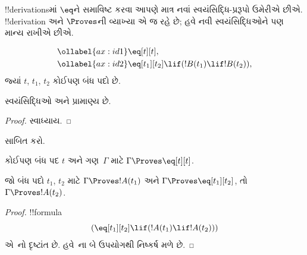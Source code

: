 \documentclass[../../../include/open-logic-section]{subfiles}
\begin{document}


!!{derivation}sમાં $\eq$ને સમાવિષ્ટ કરવા આપણે માત્ર નવાં
સ્વયંસિદ્ધિ-પ્રરૂપો ઉમેરીએ છીએ. !!{derivation} અને $\Proves$ની વ્યાખ્યા
એ જ રહે છે; હવે નવી સ્વયંસિદ્ધિઓને પણ માન્ય રાખીએ છીએ.

\begin{defn}[!!{identity} માટેની સ્વયંસિદ્ધિઓ]
\begin{align}
\ollabel{ax:id1} & \eq[t][t], \\
\ollabel{ax:id2} & \eq[t_1][t_2] \lif (!B(t_1) \lif
  !B(t_2)),
\end{align}
જ્યાં $t$, $t_1$, $t_2$ કોઈપણ બંધ પદો છે.
\end{defn}

\begin{prop}
  સ્વયંસિદ્ધિઓ  અને  પ્રામાણ્ય છે.
\end{prop}

\begin{proof}
સ્વાધ્યાય.
\end{proof}

\begin{prob}
 સાબિત કરો.
\end{prob}

\begin{prop}
 કોઈપણ બંધ પદ $t$ અને ગણ~$\Gamma$ માટે $\Gamma \Proves \eq[t][t]$.
\end{prop}

\begin{prop}
  જો બંધ પદો $t_1$, $t_2$ માટે $\Gamma \Proves !A(t_1)$ અને
  $\Gamma \Proves \eq[t_1][t_2]$, તો $\Gamma \Proves !A(t_2)$.
\end{prop}


\begin{proof}
!!{formula}
\[
(\eq[t_1][t_2] \lif (!A(t_1) \lif !A(t_2)))
\]
એ~નો દૃષ્ટાંત છે. હવે~\MP{}ના બે ઉપયોગથી નિષ્કર્ષ મળે છે.
\end{proof}
\end{document}
